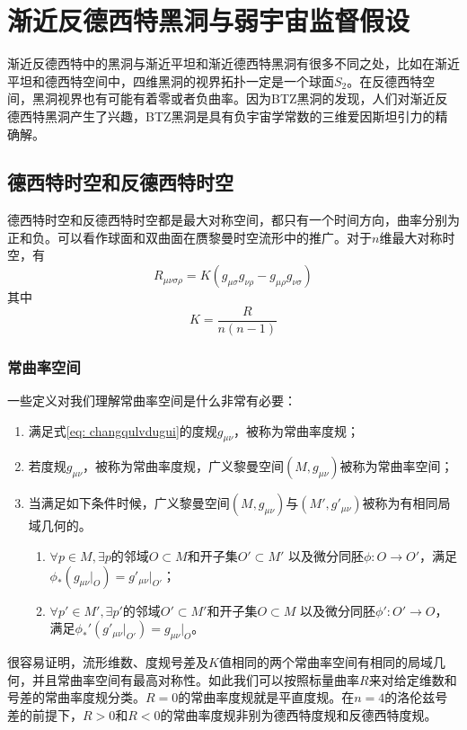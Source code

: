 \chapter{渐近反德西特黑洞与弱宇宙监督假设}
渐近反德西特中的黑洞与渐近平坦和渐近德西特黑洞有很多不同之处，比如在渐近平坦和德西特空间中，四维黑洞的视界拓扑一定是一个球面$S_2$\citep{friedman1993topological}。在反德西特空间，黑洞视界也有可能有着零或者负曲率\citep{cai2004thermodynamics}。因为BTZ黑洞\citep{banados1992black}的发现，人们对渐近反德西特黑洞产生了兴趣，BTZ黑洞是具有负宇宙学常数的三维爱因斯坦引力的精确解\citep{cai1999topological}。

\section{德西特时空和反德西特时空}
德西特时空和反德西特时空都是最大对称空间，都只有一个时间方向，曲率分别为正和负。可以看作球面和双曲面在赝黎曼时空流形中的推广\citep{陈斌2018广义相对论}。对于$n$维最大对称时空，有
\begin{equation}\label{eq: changqulvdugui}
    R_{\mu \nu \sigma \rho}=K\left(g_{\mu \sigma}g_{\nu \rho}-g_{\mu \rho}g_{\nu \sigma}\right)
\end{equation}
其中
\begin{equation}
    K=\frac{R}{n \left(n-1\right)}
\end{equation}
\subsection{常曲率空间}
一些定义对我们理解常曲率空间是什么非常有必要\citep{梁灿彬2006微分几何入门与广义相对论}：
\begin{enumerate}
    \item 满足式\eqref{eq: changqulvdugui}的度规$g_{\mu \nu}$，被称为常曲率度规；
    \item 若度规$g_{\mu \nu}$，被称为常曲率度规，广义黎曼空间$\left(M,g_{\mu \nu}\right)$被称为常曲率空间；
    \item 当满足如下条件时候，广义黎曼空间$\left(M,g_{\mu \nu}\right)$与$\left(M',g'_{\mu \nu}\right)$被称为有相同局域几何的。
    \begin{enumerate}
        \item $\forall p \in M, \exists p$的邻域$O\subset M$和开子集$O'\subset M'$ 以及微分同胚$\phi: O\rightarrow O'$，满足$\phi_* \left(g_{\mu \nu} |  _O\right)=g'_{\mu \nu}| _{O'}$；
        \item $\forall p' \in M', \exists p'$的邻域$O'\subset M'$和开子集$O\subset M$ 以及微分同胚$\phi': O'\rightarrow O$，满足$\phi_*' \left(g'_{\mu \nu} |_{O'}\right)=g_{\mu \nu}| _O$。
    \end{enumerate}
\end{enumerate}
很容易证明，流形维数、度规号差及$K$值相同的两个常曲率空间有相同的局域几何，并且常曲率空间有最高对称性\citep{梁灿彬2006微分几何入门与广义相对论}。如此我们可以按照标量曲率$R$来对给定维数和号差的常曲率度规分类。$R=0$的常曲率度规就是平直度规。在$n=4$的洛伦兹号差的前提下，$R>0$和$R<0$的常曲率度规非别为德西特度规和反德西特度规。
